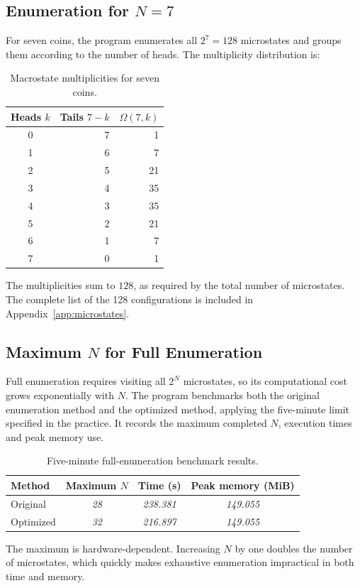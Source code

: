 \documentclass[10pt,a4paper]{article}
\begin{document}
\subsection{Enumeration for \texorpdfstring{$N=7$}{N=7}}
For seven coins, the program enumerates all $2^7=128$ microstates and groups them according to the number of heads. The multiplicity distribution is:
\begin{table}[htbp]
  \centering
  \caption{Macrostate multiplicities for seven coins.}
  \label{tab:n7}
  \begin{tabular}{c r r}
    \toprule
    Heads $k$ & Tails $7-k$ & $\Omega(7,k)$ \\
    \midrule
    0 & 7 & 1 \\
    1 & 6 & 7 \\
    2 & 5 & 21 \\
    3 & 4 & 35 \\
    4 & 3 & 35 \\
    5 & 2 & 21 \\
    6 & 1 & 7 \\
    7 & 0 & 1 \\
    \bottomrule
  \end{tabular}
\end{table}
The multiplicities sum to $128$, as required by the total number of microstates. The complete list of the 128 configurations is included in Appendix~\ref{app:microstates}.

\subsection{Maximum \texorpdfstring{$N$}{N} for Full Enumeration}
Full enumeration requires visiting all $2^N$ microstates, so its computational cost grows exponentially with $N$. The program benchmarks both the original enumeration method and the optimized method, applying the five-minute limit specified in the practice. It records the maximum completed $N$, execution times and peak memory use.

\begin{table}[htbp]
  \centering
  \caption{Five-minute full-enumeration benchmark results.}
  \label{tab:enumeration-benchmark}
  \small
  \begin{tabular}{l c c c}
    \toprule
    Method & Maximum $N$ & Time (s) & Peak memory (MiB) \\
    \midrule
    Original & \textit{28} & \textit{238.381} & \textit{149.055} \\
    Optimized & \textit{32} & \textit{216.897} & \textit{149.055} \\
    \bottomrule
  \end{tabular}
\end{table}
The maximum is hardware-dependent. Increasing $N$ by one doubles the number of microstates, which quickly makes exhaustive enumeration impractical in both time and memory.
\end{document}

